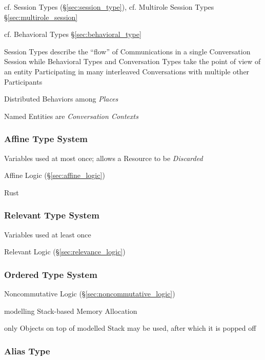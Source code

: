 \fist cf. Session Types (\S\ref{sec:session_type}), \fist cf.
Multirole Session Types \S\ref{sec:multirole_session}

\fist cf. Behavioral Types \S\ref{sec:behavioral_type}

Session Types describe the ``flow'' of Communications in a single
Conversation Session while Behavioral Types and Conversation Types
take the point of view of an entity Participating in many interleaved
Conversations with multiple other Participants

Distributed Behaviors among \emph{Places}

Named Entities are \emph{Conversation Contexts}



\subsubsection{Affine Type System}\label{sec:affine_type}\hfill

Variables used at most once; allows a Resource to be \emph{Discarded}

Affine Logic (\S\ref{sec:affine_logic})

Rust



\subsubsection{Relevant Type System}\label{sec:relevant_type}

Variables used at least once

Relevant Logic (\S\ref{sec:relevance_logic})



\subsubsection{Ordered Type System}\label{sec:ordered_type}

Noncommutative Logic (\S\ref{sec:noncommutative_logic})

modelling Stack-based Memory Allocation

only Objects on top of modelled Stack may be used, after which it is
popped off



\subsubsection{Alias Type}\label{sec:alias_type}

